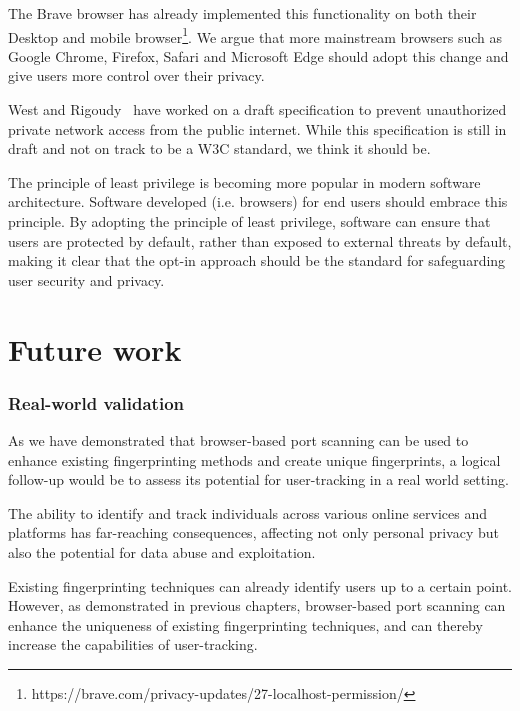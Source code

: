 The Brave browser has already implemented this functionality on both their Desktop and mobile browser\footnote{https://brave.com/privacy-updates/27-localhost-permission/}. We argue that more mainstream browsers such as Google Chrome, Firefox, Safari and Microsoft Edge should adopt this change and give users more control over their privacy. 

West and Rigoudy~\cite{rigoudy2023} have worked on a draft specification to prevent unauthorized private network access from the public internet. While this specification is still in draft and not on track to be a W3C standard, we think it should be. 

The principle of least privilege is becoming more popular in modern software architecture. Software developed (i.e. browsers) for end users should embrace this principle. By adopting the principle of least privilege, software can ensure that users are protected by default, rather than exposed to external threats by default, making it clear that the opt-in approach should be the standard for safeguarding user security and privacy.





\section{Future work}

\subsubsection{Real-world validation}

As we have demonstrated that browser-based port scanning can be used to enhance existing fingerprinting methods and create unique fingerprints, a logical follow-up would be to assess its potential for user-tracking in a real world setting.

The ability to identify and track individuals across various online services and platforms has far-reaching consequences, affecting not only personal privacy but also the potential for data abuse and exploitation.

Existing fingerprinting techniques can already identify users up to a certain point. However, as demonstrated in previous chapters, browser-based port scanning can enhance the uniqueness of existing fingerprinting techniques, and can thereby increase the capabilities of user-tracking.

